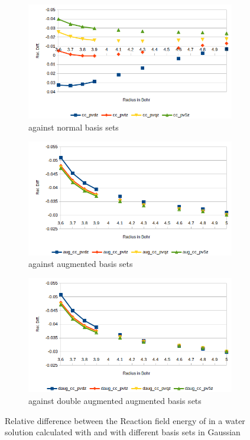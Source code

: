 \documentclass[../Thesis.tex]{subfiles}
\begin{document}
\begin{figure}[h!]
  \centering
  \begin{subfigure}[b]{0.75\linewidth}
    \includegraphics[width=\linewidth]{img/cyanreldiff.png}
    \caption{\mrchem against normal basis sets}
  \end{subfigure}
  \begin{subfigure}[b]{0.75\linewidth}
    \includegraphics[width=\linewidth]{img/cyanaugreldiff.png}
    \caption{\mrchem against augmented basis sets}
  \end{subfigure}
  \begin{subfigure}[b]{0.75\linewidth}
    \includegraphics[width=\linewidth]{img/cyandaugreldiff.png}
    \caption{\mrchem against double augmented augmented basis sets}
  \end{subfigure}
  \caption[Relative difference between methods for ]{Relative difference between the Reaction field energy of  in a water solution calculated with \mrchem
  and with different basis sets in Gaussian}
  \label{fig:cyanreldiff}
\end{figure}



\biblio
\end{document}
